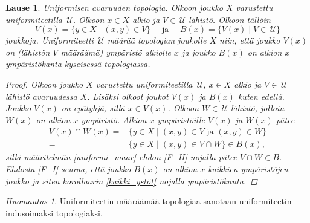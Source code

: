 \documentclass[12pt,a4paper,leqno]{report}
\newcommand{\U}{\,\mathcal{U}}
\theoremstyle{plain}
\newtheorem{lause}[equation]{Lause}
\theoremstyle{definition}
\theoremstyle{remark}
\newtheorem{huom}[equation]{Huomautus}
\begin{document}
\begin{lause}
Uniformisen avaruuden topologia.
Olkoon joukko $X$ varustettu uniformiteetilla $\U$.
Olkoon $x\in X$ 
alkio ja $V\in\U$ lähistö. 
Olkoon tällöin %
\begin{equation*}V(x)=\{ y\in X\mid (x,y)\in V \}
\quad\text{ ja }\quad
B(x)=\{ V(x)\mid V\in\U \}
\end{equation*}
joukkoja.
Uniformiteetti $\U$ määrää topologian joukolle $X$ niin, 
että joukko $V(x)$ on (lähistön $V$ määräämä) ympäristö 
alkiolle $x$ ja joukko $B(x)$ on alkion $x$ 
ympäristökanta kyseisessä topologiassa.
\begin{proof}
Olkoon joukko $X$ varustettu uniformiteetilla $\U$, 
$x\in X$ alkio ja $V\in\U$ lähistö avaruudessa $X$. Lisäksi olkoot joukot $V(x)$ ja $B(x)$ kuten edellä. 
%
Joukko $V(x)$ on epätyhjä, sillä $x\in V(x)$.
Olkoon $W\in\U$ lähistö, jolloin $W(x)$ on alkion $x$ ympäristö. 
Alkion $x$ ympäristöille $V(x)$ ja $W(x)$ pätee
\begin{align*}
V(x)\cap W(x) =&\{ y\in X\mid (x,y)\in V \text{ ja } (x,y)\in W \}\\
=&\{ y\in X\mid (x,y)\in V\cap W \}
\in B(x),
\end{align*} 
sillä määritelmän \ref{uniformi_maar} ehdon \ref{F_II} 
nojalla pätee $ V\cap W \in B$. 
Ehdosta \ref{F_I} seuraa, että 
joukko $B(x)$ on alkion $x$ kaikkien ympäristöjen joukko ja siten 
korollaarin \ref{kaikki_ystöt} nojalla ympäristökanta.
\end{proof}
\end{lause}
\begin{huom}\label{unif_indusoitu_topo}
Uniformiteetin määräämää topologiaa sanotaan uniformiteetin indusoimaksi topologiaksi.
\end{huom}
\end{document}
